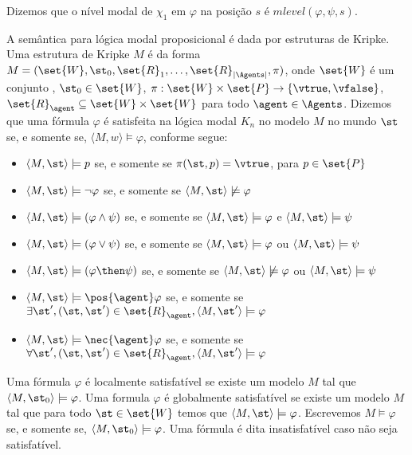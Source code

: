 Dizemos que o nível modal de $\chi_1$ em $\varphi$ na posição $s$ é $mlevel(\varphi, \psi, s)$.

A semântica para lógica modal proposicional é dada por estruturas de Kripke. Uma estrutura de Kripke $M$ é da forma $M = (\set{W}, \st_0, \set{R}_1, \ldots, \set{R}_{|\Agents|}, \pi)$, onde %
$\set{W}$ é um conjunto%
, $\st_0 \in \set{W}$, $\pi:\set{W} \times \set{P} \rightarrow \{\vtrue, \vfalse\}$, $\set{R}_\agent \subseteq \set{W} \times \set{W}$ para todo $\agent \in \Agents$. Dizemos que uma fórmula $\varphi$ é satisfeita na lógica modal $K_n$ no modelo $M$ no mundo $\st$ se, e somente se, $\langle M,w \rangle \models \varphi$, conforme segue:

\begin{itemize}
	\item $\langle M,\st \rangle \models p$ se, e somente se $\pi(\st, p) = \vtrue$, para $p \in \set{P}$
	\item $\langle M,\st \rangle \models \neg\varphi$ se, e somente se $\langle M,\st \rangle \not\models \varphi$
	\item $\langle M,\st \rangle \models (\varphi \land \psi)$ se, e somente se $\langle M,\st \rangle \models \varphi$ e $\langle M,\st \rangle \models \psi$
	\item $\langle M,\st \rangle \models (\varphi \lor \psi)$ se, e somente se $\langle M,\st \rangle \models \varphi$ ou $\langle M,\st \rangle \models \psi$
	\item $\langle M,\st \rangle \models (\varphi \then \psi)$ se, e somente se $\langle M,\st \rangle \not\models \varphi$ ou $\langle M,\st \rangle \models \psi$
	
	\item $\langle M,\st \rangle \models \pos{\agent}\varphi$ se, e somente se $\exists\st', (\st, \st') \in \set{R}_\agent, \langle M,\st' \rangle \models \varphi$
	\item $\langle M,\st \rangle \models \nec{\agent}\varphi$ se, e somente se $\forall\st', (\st, \st') \in \set{R}_\agent, \langle M,\st' \rangle \models \varphi$
	
\end{itemize}

Uma fórmula $\varphi$ é localmente satisfatível se existe um modelo $M$ tal que $\langle M,\st_0 \rangle \models \varphi$. Uma formula $\varphi$ é globalmente satisfatível se existe um modelo $M$ tal que para todo $\st \in \set{W}$ temos que $\langle M,\st \rangle \models \varphi$. Escrevemos $M \models \varphi$ se, e somente se, $\langle M, \st_0 \rangle \models \varphi$. Uma fórmula é dita insatisfatível caso não seja satisfatível.

